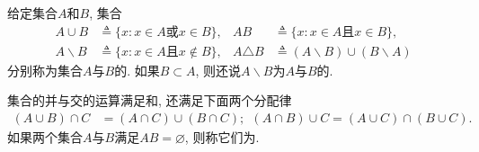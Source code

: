 给定集合$A$和$B$, 集合
\begin{align}
A\cup B &\triangleq \{ x: x\in A\text{或} x\in B\},&AB &\triangleq \{ x: x\in A\text{且} x\in B\},\nonumber\\
A\backslash B &\triangleq \{ x:x\in A\text{且}x\notin B \},&A\triangle B &\triangleq (A\backslash B)\cup(B\backslash A)
\end{align}
分别称为集合$A$与$B$的. 如果$B\subset A$, 则还说$A\backslash B$为$A$与$B$的.

集合的并与交的运算满足和, 还满足下面两个分配律\begin{align}
(A\cup B)\cap C &= (A\cap C)\cup (B\cap C);~~(A\cap B)\cup C = (A\cup C)\cap (B\cup C).
\end{align}
如果两个集合$A$与$B$满足$AB = \varnothing$, 则称它们为.

